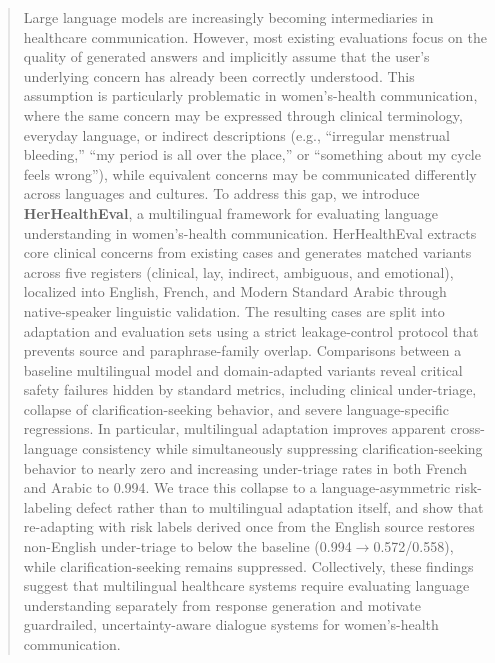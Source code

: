 \begin{abstract}
Large language models are increasingly becoming intermediaries in healthcare communication. However, most existing evaluations focus on the quality of generated answers and implicitly assume that the user's underlying concern has already been correctly understood. This assumption is particularly problematic in women's-health communication, where the same concern may be expressed through clinical terminology, everyday language, or indirect descriptions (e.g., ``irregular menstrual bleeding,'' ``my period is all over the place,'' or ``something about my cycle feels wrong''), while equivalent concerns may be communicated differently across languages and cultures. To address this gap, we introduce \textbf{HerHealthEval}, a multilingual framework for evaluating language understanding in women's-health communication. HerHealthEval extracts core clinical concerns from existing cases and generates matched variants across five registers (clinical, lay, indirect, ambiguous, and emotional), localized into English, French, and Modern Standard Arabic through native-speaker linguistic validation. The resulting cases are split into adaptation and evaluation sets using a strict leakage-control protocol that prevents source and paraphrase-family overlap. %
Comparisons between a baseline multilingual model and domain-adapted variants reveal critical safety failures hidden by standard metrics, including clinical under-triage, collapse of clarification-seeking behavior, and severe language-specific regressions. In particular, multilingual adaptation improves apparent cross-language consistency while simultaneously suppressing clarification-seeking behavior to nearly zero and increasing under-triage rates in both French and Arabic to 0.994. We trace this collapse to a language-asymmetric risk-labeling defect rather than to multilingual adaptation itself, and show that re-adapting with risk labels derived once from the English source restores non-English under-triage to below the baseline (0.994$\rightarrow$0.572/0.558), while clarification-seeking remains suppressed. Collectively, these findings suggest that multilingual healthcare systems require evaluating language understanding separately from response generation and motivate guardrailed, uncertainty-aware dialogue systems for women's-health communication.
\end{abstract}

